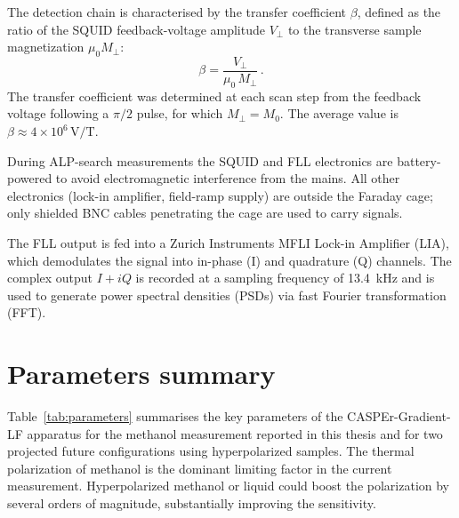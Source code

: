 The detection chain is characterised by the transfer coefficient $\beta$, defined as the ratio of the SQUID feedback-voltage amplitude $V_\perp$ to the transverse sample magnetization $\mu_0 M_\perp$:
\begin{equation}
    \beta = \frac{V_\perp}{\mu_0\,M_\perp}
    \,.\label{eq:beta}
\end{equation}
The transfer coefficient was determined at each scan step from the feedback voltage following a $\pi/2$ pulse, for which $M_\perp = M_0$. The average value is $\beta \approx 4\times10^6\,\mathrm{V/T}$.

During ALP-search measurements the SQUID and FLL electronics are battery-powered to avoid electromagnetic interference from the mains. All other electronics (lock-in amplifier, field-ramp supply) are outside the Faraday cage; only shielded BNC cables penetrating the cage are used to carry signals.

The FLL output is fed into a Zurich Instruments MFLI Lock-in Amplifier (LIA), which demodulates the signal into in-phase (I) and quadrature (Q) channels. The complex output $I + iQ$ is recorded at a sampling frequency of \SI{13.4}{\kHz} and is used to generate power spectral densities (PSDs) via fast Fourier transformation (FFT).


\section{Parameters summary}\label{sec:apparatus:params}

Table~\ref{tab:parameters} summarises the key parameters of the CASPEr-Gradient-LF apparatus for the methanol measurement reported in this thesis and for two projected future configurations using hyperpolarized samples. The thermal polarization of methanol is the dominant limiting factor in the current measurement. Hyperpolarized methanol or liquid  could boost the polarization by several orders of magnitude, substantially improving the sensitivity.

